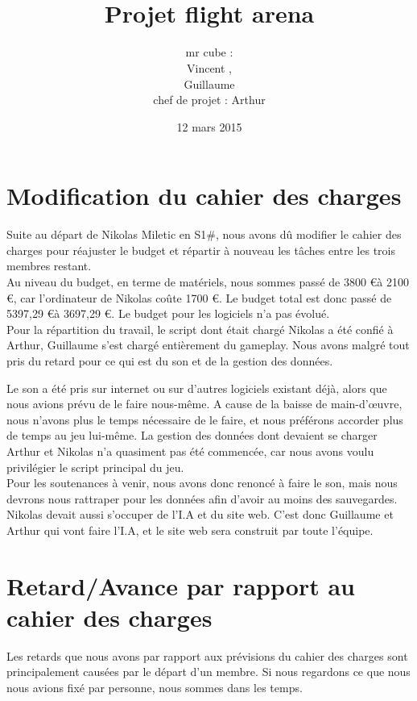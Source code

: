 \documentclass[10pt, titlepage]{report}
\title{\bsc{Rapport de la première soutenance}\\Projet flight arena}
\author{mr cube :\\
Vincent \bsc{Rospini-Clerici},\\
Guillaume \bsc{Rebut}\\
chef de projet : Arthur \bsc{Remaud}}
\date{12 mars 2015}
\begin{document}
\maketitle
\renewcommand{\contentsname}{Sommaire}
\renewcommand{\chaptername}{Partie}

\tableofcontents

\chapter{Modification du cahier des charges}
Suite au départ de Nikolas Miletic en S1\#, nous avons dû modifier le cahier des charges pour réajuster le budget et répartir à nouveau les tâches entre les trois membres restant.\\

Au niveau du budget, en terme de matériels, nous sommes passé de 3800 \euro à 2100 \euro, car l'ordinateur de Nikolas coûte 1700 \euro. Le budget total est donc passé de 5397,29 \euro à 3697,29 \euro. Le budget pour les logiciels n'a pas évolué.\\

Pour la répartition du travail, le script dont était chargé Nikolas a été confié à Arthur, Guillaume s'est chargé entièrement du gameplay. Nous avons malgré tout pris du retard pour ce qui est du son et de la gestion des données.

Le son a été pris sur internet ou sur d'autres logiciels existant déjà, alors que nous avions prévu de le faire nous-même. A cause de la baisse de main-d'œuvre, nous n'avons plus le temps nécessaire de le faire, et nous préférons accorder plus de temps au jeu lui-même. La gestion des données dont devaient se charger Arthur et Nikolas n'a quasiment pas été commencée, car nous avons voulu privilégier le script principal du jeu.\\

Pour les soutenances à venir, nous avons donc renoncé à faire le son, mais nous devrons nous rattraper pour les données afin d'avoir au moins des sauvegardes. Nikolas devait aussi s'occuper de l'I.A et du site web. C'est donc Guillaume et Arthur qui vont faire l'I.A, et le site web sera construit par toute l'équipe.\\

\chapter{Retard/Avance par rapport au cahier des charges}
Les retards que nous avons par rapport aux prévisions du cahier des charges sont principalement causées par le départ d'un membre. Si nous regardons ce que nous nous avions fixé par personne, nous sommes dans les temps. 
\end{document}
